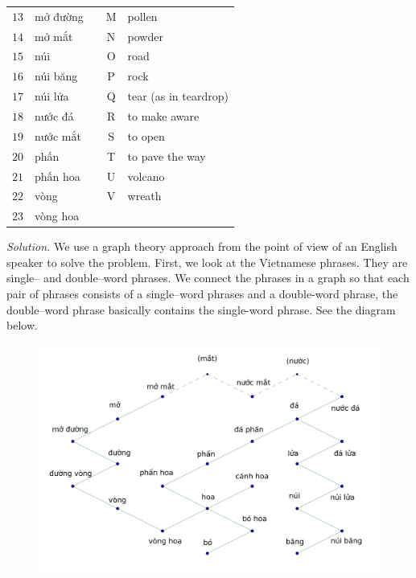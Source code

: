 \begin{multicols}{2}
\begin{table}[H]
{\begin{tabular}{|c|l|c|c|l|}
				$13$ & mở đường   &  & M & pollen                              \\ \cline{1-2} \cline{4-5} 
				$14$ & mở mắt     &  & N & powder                              \\ \cline{1-2} \cline{4-5} 
				$15$ & núi        &  & O & road                                \\ \cline{1-2} \cline{4-5} 
				$16$ & núi băng   &  & P & rock                                \\ \cline{1-2} \cline{4-5} 
				$17$ & núi lửa    &  & Q & tear (as in teardrop)               \\ \cline{1-2} \cline{4-5} 
				$18$ & nước đá    &  & R & to make aware                       \\ \cline{1-2} \cline{4-5} 
				$19$ & nước mắt   &  & S & to open                             \\ \cline{1-2} \cline{4-5} 
				$20$ & phấn       &  & T & to pave the way                     \\ \cline{1-2} \cline{4-5} 
				$21$ & phấn hoa   &  & U & volcano                             \\ \cline{1-2} \cline{4-5} 
				$22$ & vòng       &  & V & wreath                              \\ \cline{1-2} \cline{4-5} 
				$23$ & vòng hoa   &  &   &                                     \\ \cline{1-2} \cline{4-5} 
		\end{tabular}}
		\vspace*{-10pt}
	\end{table}
\textit{Solution.}
We use a graph theory approach from the point of view of an English speaker to solve the problem.
\vskip 0.1cm
First, we look at the Vietnamese phrases. They are single-- and double--word phrases.
We connect the phrases in a graph so that each pair of phrases consists of a single--word phrases and a double-word phrase,
the double--word phrase basically contains the single-word phrase. See the diagram below.
\begin{figure}[H]
	\vspace*{-5pt}
	\centering
	\captionsetup{labelformat= empty, justification=centering}
	\includegraphics[width= 1\linewidth]{hc-2022-2-2-2-1.pdf}

\end{figure}
\end{multicols}
